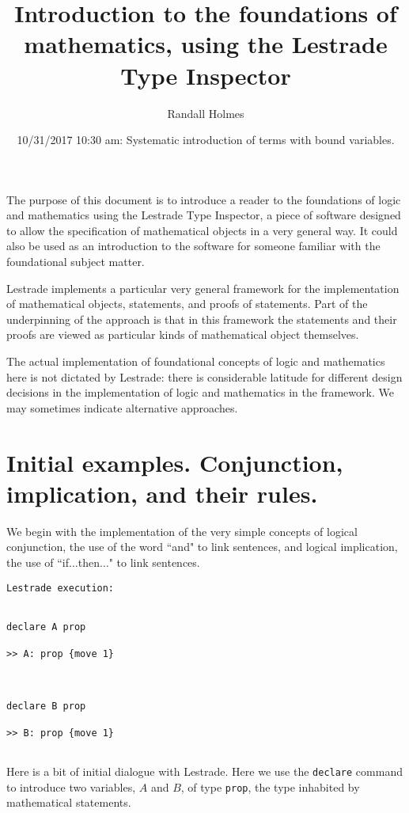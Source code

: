 \documentclass[12pt]{article}
\title{Introduction to the foundations of mathematics, using the Lestrade Type Inspector}
\author{Randall Holmes}
\date{10/31/2017 10:30 am:  Systematic introduction of terms with bound variables.}
\begin{document}
\maketitle

\tableofcontents

\newpage

The purpose of this document is to introduce a reader to the foundations of logic and mathematics using the Lestrade Type Inspector, a piece of software designed to allow the specification of mathematical objects in a very general way.  It could also be used as an introduction to the software for someone familiar with the foundational subject matter.

Lestrade implements a particular very general framework for the implementation of mathematical objects, statements, and proofs of statements.  Part of the underpinning of the approach is that in this framework the statements and their proofs are viewed as  particular kinds of mathematical object themselves.

The actual implementation of foundational concepts of logic and mathematics here is not dictated by Lestrade:  there is considerable latitude for different design decisions in the implementation of logic and mathematics in the framework.  We may sometimes indicate alternative approaches.

\section{Initial examples.  Conjunction, implication, and their rules.}

We begin with the implementation of the very simple concepts of logical conjunction, the use of the word ``and" to link sentences, and logical implication, the use of ``if$\ldots$then$\ldots$" to link sentences.

\begin{verbatim}Lestrade execution:


declare A prop

>> A: prop {move 1}



declare B prop

>> B: prop {move 1}


\end{verbatim}

Here is a bit of initial dialogue with Lestrade.  Here we use the {\tt declare} command to introduce two variables, $A$ and $B$, of type {\tt prop},
the type inhabited by mathematical statements.
\end{document}
